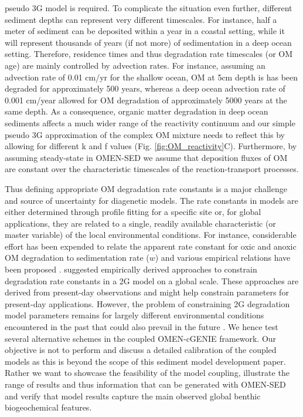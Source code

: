\documentclass[gmd, manuscript]{copernicus}
\begin{document}
pseudo 3G model  \citep[including two degradable and one refractory fraction,][]{soetaert_model_1996, boudreau1997diagenetic, stolpovsky_toward_2015} is required. 
To complicate the situation even further, different sediment depths can represent very different timescales. For instance, half a meter of sediment can be deposited within a year in a coastal setting, while it will represent thousands of years 
(if not more) of sedimentation in a deep ocean setting. Therefore, residence times and thus degradation rate timescales (or OM age) are mainly controlled by advection rates. For instance, assuming an advection rate of 0.01 cm/yr for the shallow ocean, OM 
at 5cm depth is has been degraded for approximately 500 years, whereas a deep ocean advection rate of 0.001 cm/year allowed for OM degradation of approximately 5000 years at the same depth. As a consequence, organic matter degradation in deep 
ocean sediments affects a much wider range of the reactivity continuum and our simple pseudo 3G approximation of the complex OM mixture needs to reflect this by allowing for different k and f values (Fig. \ref{fig:OM_reactivity}C).  
Furthermore, by assuming steady-state in OMEN-SED we assume that deposition fluxes of OM are constant over the characteristic timescales of the reaction-transport processes.

Thus defining appropriate OM degradation rate constants is a major challenge and source of uncertainty for diagenetic models. The rate constants in models are either determined through profile fitting for a specific site or, 
for global applications, they are related to a single, readily available characteristic (or master variable) of the local environmental conditions. 
For instance, considerable effort has been expended to relate the apparent rate constant for oxic and 
anoxic OM degradation to sedimentation rate ($w$) and various empirical relations have been proposed \citep{toth_organic_1977, tromp_global_1995, boudreau1997diagenetic}. 
\citet{stolpovsky_toward_2015, stolpovsky_new_2017} suggested empirically derived approaches to constrain degradation rate constants in a 2G model on a global scale. These approaches are derived from present-day observations and might help 
constrain parameters for present-day applications. However, the problem of constraining 2G degradation model parameters remains for largely different environmental conditions encountered in the past that could also prevail in the future \citep{arndt_quantifying_2013}.
We hence test several alternative schemes in the coupled OMEN-cGENIE framework. 
Our objective is not to perform and discuss a detailed calibration of the coupled models as this is beyond the scope of this sediment model development paper. 
Rather we want to showcase the feasibility of the model coupling, illustrate the range of results and thus information that can be generated with OMEN-SED and verify that model results capture the main observed global benthic biogeochemical features. 
\end{document}
